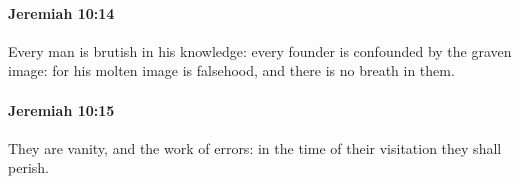 		\paragraph{Jeremiah 10:14} %
			\label{JEREMIAH-10-14}

			Every man is brutish in his knowledge: every founder is confounded by the graven image: for his molten image is falsehood, and there is no breath in them.


		\paragraph{Jeremiah 10:15} %
			\label{JEREMIAH-10-15}

			They are vanity, and the work of errors: in the time of their visitation they shall perish.


